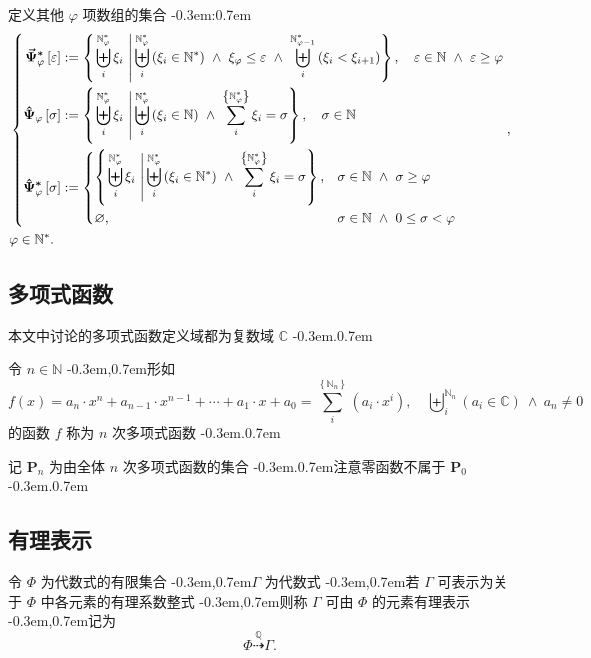 \documentclass{article}
\newcommand\BrSetN[1]{\Set{\MathPartialSetN{#1}}}
\newcommand\BrSetU[1]{\Set{\MathPartialSetU{#1}}}
\newcommand\InSetC[1]{\InSet{#1}{\MathSetC}}
\newcommand\InSetN[1]{\InSet{#1}{\MathSetN}}
\newcommand\InSetU[1]{\InSet{#1}{\MathSetU}}
\newcommand\MathPartialSetN[1]{\mathbb{N}_{#1}}
\newcommand\MathPartialSetU[1]{\mathbb{N}^{\ast}_{#1}}
\newcommand\MathSetC{\mathbb{C}}
\newcommand\MathSetN{\mathbb{N}}
\newcommand\MathSetQ{\mathbb{Q}}
\newcommand\MathSetU{\mathbb{N}^{\ast}}
\newcommand\NormalSeqOfU[3]{\SeqOfU{#1}{#2} #3_{#1}}
\newcommand\NormalSumOfU[3]{\SumOfU{#1}{#2} #3_{#1}}
\newcommand\SeqOfNInSetC[3]{\SeqOfN{#1}{#2} \Bracket{\InSetC{#3_{#1}}}}
\newcommand\SeqOfUInSetN[3]{\SeqOfU{#1}{#2} \Bracket{\InSetN{#3_{#1}}}}
\newcommand\SeqOfUInSetU[3]{\SeqOfU{#1}{#2} \Bracket{\InSetU{#3_{#1}}}}
\newcommand\SeqOfN[2]{\Seq{#1}{\MathPartialSetN{#2}}}
\newcommand\SeqOfU[2]{\Seq{#1}{\MathPartialSetU{#2}}}
\newcommand\SumOfN[2]{\sum_{#1}^{\BrSetN{#2}}}
\newcommand\SumOfU[2]{\sum_{#1}^{\BrSetU{#2}}}
\newcommand\BoldPsiHat[2]{\BracketMidFunc{\hat{\Psi}}{#1}{#2}}
\newcommand\BoldPsiHatAst[2]{\BracketMidFuncAst{\hat{\Psi}}{#1}{#2}}
\newcommand\BoldPsiVecAst[2]{\BracketMidFuncAst{\vec{\Psi}}{#1}{#2}}
\newcommand\Bracket[1]{\left( #1 \right)}
\newcommand\BracketBig[1]{\left\{ #1 \right\}}
\newcommand\BracketMid[1]{\left[ #1 \right]}
\newcommand\BracketMidFunc[3]{\bm{#1}_{#2} \BracketMid{#3}}
\newcommand\BracketMidFuncAst[3]{\bm{#1}^{\bm{\ast}}_{#2} \BracketMid{#3}}
\newcommand\CaseDomain[1]{\DomainComma & #1}
\newcommand\Colon{:}
\newcommand\Comma{,}
\newcommand\DefineAs{:=}
\newcommand\Domain[1]{\DomainComma \quad #1}
\newcommand\DomainAnd{\LogicAnd}
\newcommand\DomainComma{\Comma}
\newcommand\EmptySet{\varnothing}
\newcommand\FlatPolynomial{a_{n} \cdot x^{n} + a_{n-1} \cdot x^{n-1} + \cdots + a_{1} \cdot x + a_{0}}
\newcommand\Func[2]{#1 \Bracket{#2}}
\newcommand\GrowSeq[2]{\SeqOfU{i}{#1-1} \Bracket{#2_{i} < #2_{i+1}}}
\newcommand\InSet[2]{#1 \in #2}
\newcommand\Logic[1]{\ #1\ }
\newcommand\LogicAnd{\Logic{\wedge}}
\newcommand\NeqZero[1]{#1 \neq 0}
\newcommand\Polynomial[2]{\SumOfN{i}{#1} \Bracket{#2_{i} \cdot x^{i}}}
\newcommand\PolynomialDefault{\Polynomial{n}{a}}
\newcommand\PolynomialSet[1]{\mathbf{P}_{#1}}
\newcommand\RationalEx{\stackrel{\MathSetQ}{\dashrightarrow}}
\newcommand\Seq[2]{\biguplus_{#1}^{#2}}
\newcommand\SeqXi{\NormalSeqOfU{i}{\varphi}{\xi}}
\newcommand\Set[1]{\BracketBig{#1}}
\newcommand\SetDefAnd{\LogicAnd}
\newcommand\SetDefinition[2]{\Set{\left. #1 \ \right| #2}}
\newcommand\EqEndPeriod{.}
\newcommand\TextColon{\TextPunctuation{\Colon}}
\newcommand\TextComma{\TextPunctuation{\Comma}}
\newcommand\TextPeriod{\TextPunctuation{.}}
\newcommand\TextPunctuation[1]{\kern -0.3em#1\kern 0.7em}
\begin{document}
	定义其他 $\varphi$ 项数组的集合 \TextColon
	\begin{align*}
	& \left\{ \begin{aligned}
	\BoldPsiVecAst{\varphi}{\varepsilon} & \DefineAs \SetDefinition{\SeqXi}{\SeqOfUInSetU{i}{\varphi}{\xi} \SetDefAnd \xi_{\varphi} \leq \varepsilon \SetDefAnd \GrowSeq{\varphi}{\xi}} \Domain{\InSetN{\varepsilon} \DomainAnd \varepsilon \geq \varphi} \\
	\BoldPsiHat{\varphi}{\sigma} & \DefineAs \SetDefinition{\SeqXi}{\SeqOfUInSetN{i}{\varphi}{\xi} \SetDefAnd \NormalSumOfU{i}{\varphi}{\xi} = \sigma} \Domain{\InSetN{\sigma}} \\
	\BoldPsiHatAst{\varphi}{\sigma} & \DefineAs
	\begin{dcases}
	\SetDefinition{\SeqXi}{\SeqOfUInSetU{i}{\varphi}{\xi} \SetDefAnd \NormalSumOfU{i}{\varphi}{\xi} = \sigma} \CaseDomain{\InSetN{\sigma} \DomainAnd \sigma \geq \varphi} \\
	\EmptySet \CaseDomain{\InSetN{\sigma} \DomainAnd 0 \leq \sigma < \varphi}
	\end{dcases}
	\end{aligned} \right. \DomainComma \\
	& \InSetU{\varphi} \EqEndPeriod
	\end{align*}
	
	
	\subsection{多项式函数}
	本文中讨论的多项式函数定义域都为复数域 $\MathSetC$ \TextPeriod
	
	令 $\InSetN{n}$ \TextComma 形如
	\begin{equation*}
	\Func{f}{x} = \FlatPolynomial = \PolynomialDefault \Domain{\SeqOfNInSetC{i}{n}{a} \DomainAnd \NeqZero{a_{n}}}
	\end{equation*}
	的函数 $f$ 称为 $n$ 次多项式函数 \TextPeriod
	
	记 $\PolynomialSet{n}$ 为由全体 $n$ 次多项式函数的集合 \TextPeriod 注意零函数不属于 $\PolynomialSet{0}$ \TextPeriod
	
	
	\subsection{有理表示}
	令 $\Phi$ 为代数式的有限集合 \TextComma $\Gamma$ 为代数式 \TextComma 若 $\Gamma$ 可表示为关于 $\Phi$ 中各元素的有理系数整式 \TextComma 则称 $\Gamma$ 可由 $\Phi$ 的元素有理表示 \TextComma 记为
	\begin{equation*}
	\Phi \RationalEx \Gamma \EqEndPeriod
	\end{equation*}
	
\end{document}
